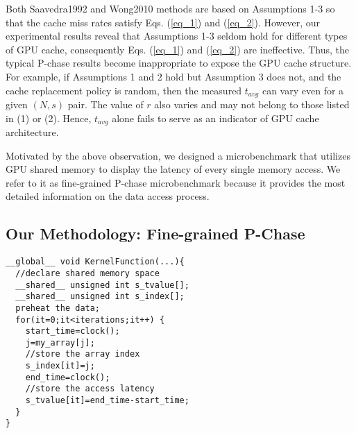 \documentclass[10pt,journal,compsoc]{IEEEtran}
\theoremstyle{definition}
\begin{document}
Both Saavedra1992 and Wong2010 methods are based on Assumptions 1-3 so that the cache miss rates satisfy Eqs. (\ref{eq_1}) and (\ref{eq_2}). However, our experimental results reveal that Assumptions 1-3 seldom hold for different types of GPU cache, consequently Eqs. (\ref{eq_1}) and (\ref{eq_2}) are ineffective. Thus, the typical P-chase results become inappropriate to expose the GPU cache structure. For example, if Assumptions 1 and 2 hold but Assumption 3 does not, and the cache replacement policy is random, then the measured $t_{avg}$ can vary even for a given $(N, s)$ pair. The value of $r$ also varies and may not belong to those listed in (1) or (2). Hence, $t_{avg}$ alone fails to serve as an indicator of GPU cache architecture.

Motivated by the above observation, we designed a microbenchmark that utilizes GPU shared memory to display the latency of every single memory access. We refer to it as fine-grained P-chase microbenchmark because it provides the most detailed information on the data access process.

\subsection{Our Methodology: Fine-grained P-Chase}

\renewcommand{\thelstlisting}{\arabic{lstlisting}}
\begin{lstlisting}[caption={Fine-grained P-chase kernel (single thread, single CTA)}, label={list_kernelcode}]
__global__ void KernelFunction(...){
  //declare shared memory space
  __shared__ unsigned int s_tvalue[];
  __shared__ unsigned int s_index[];
  preheat the data;
  for(it=0;it<iterations;it++) {
    start_time=clock();
    j=my_array[j];
    //store the array index	
    s_index[it]=j;
    end_time=clock();
    //store the access latency
    s_tvalue[it]=end_time-start_time;
  }
}
\end{lstlisting}
\end{document}
